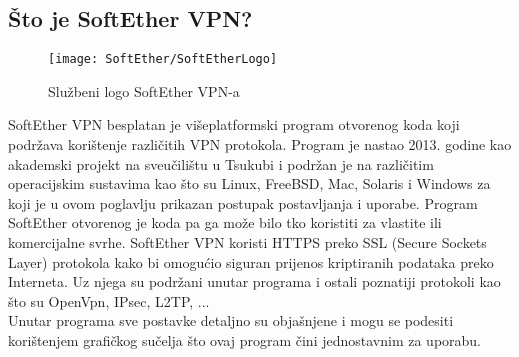 \bigbreak
\subsection*{Što je SoftEther VPN?}

\begin{wrapfigure}{r}{0.5\textwidth} 
     \centering
     \texttt{[image: SoftEther/SoftEtherLogo]}
	\caption{Službeni logo SoftEther VPN-a}
\end{wrapfigure}
\hspace{0.5cm}
SoftEther VPN\cite{softether} besplatan je višeplatformski program otvorenog koda koji podržava korištenje različitih VPN protokola. Program je nastao 2013. godine kao akademski projekt na sveučilištu u Tsukubi i podržan je na različitim operacijskim sustavima kao što su Linux, FreeBSD, Mac, Solaris i Windows za koji je u ovom poglavlju prikazan postupak postavljanja i uporabe.
\smallbreak
Program SoftEther otvorenog je koda pa ga može bilo tko koristiti za vlastite ili komercijalne svrhe.\smallbreak
SoftEther VPN koristi HTTPS preko SSL (Secure Sockets Layer)\cite{ssl}
protokola kako bi omogućio siguran prijenos kriptiranih podataka preko Interneta. Uz njega su podržani unutar programa i ostali poznatiji protokoli kao što su OpenVpn, IPsec, L2TP, ...\\
Unutar programa sve postavke detaljno su objašnjene i mogu se podesiti korištenjem grafičkog sučelja što ovaj program čini jednostavnim za uporabu.

\FloatBarrier

\bigbreak
